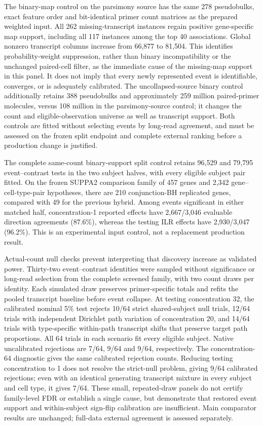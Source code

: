 \documentclass[11pt]{article}
\begin{document}
The binary-map control on the parsimony source has the same 278 pseudobulks, exact feature order and bit-identical primer count matrices as the prepared weighted input. All 262 missing-transcript instances regain positive gene-specific map support, including all 117 instances among the top 40 associations. Global nonzero transcript columns increase from 66,877 to 81,504. This identifies probability-weight suppression, rather than binary incompatibility or the unchanged paired-cell filter, as the immediate cause of the missing-map support in this panel. It does not imply that every newly represented event is identifiable, converges, or is adequately calibrated. The uncollapsed-source binary control additionally retains 388 pseudobulks and approximately 259 million paired-primer molecules, versus 108 million in the parsimony-source control; it changes the count and eligible-observation universe as well as transcript support. Both controls are fitted without selecting events by long-read agreement, and must be assessed on the frozen split endpoint and complete external ranking before a production change is justified.

The complete same-count binary-support split control retains 96,529 and 79,795 event--contrast tests in the two subject halves, with every eligible subject pair fitted. On the frozen SUPPA2 comparison family of 457 genes and 2,342 gene--cell-type-pair hypotheses, there are 210 conjunction-BH replicated genes, compared with 49 for the previous hybrid. Among events significant in either matched half, concentration-1 reported effects have 2,667/3,046 evaluable direction agreements (87.6\%), whereas the testing ILR effects have 2,930/3,047 (96.2\%). This is an experimental input control, not a replacement production result.

Actual-count null checks prevent interpreting that discovery increase as validated power. Thirty-two event--contrast identities were sampled without significance or long-read selection from the complete screened family, with two count draws per identity. Each simulated draw preserves primer-specific totals and refits the pooled transcript baseline before event collapse. At testing concentration 32, the calibrated nominal 5\% test rejects 10/64 strict shared-subject null trials, 12/64 trials with independent Dirichlet path variation of concentration 20, and 14/64 trials with type-specific within-path transcript shifts that preserve target path proportions. All 64 trials in each scenario fit every eligible subject. Native uncalibrated rejections are 7/64, 9/64 and 9/64, respectively. The concentration-64 diagnostic gives the same calibrated rejection counts. Reducing testing concentration to 1 does not resolve the strict-null problem, giving 9/64 calibrated rejections; even with an identical generating transcript mixture in every subject and cell type, it gives 7/64. These small, repeated-draw panels do not certify family-level FDR or establish a single cause, but demonstrate that restored event support and within-subject sign-flip calibration are insufficient. Main comparator results are unchanged; full-data external agreement is assessed separately.
\end{document}
